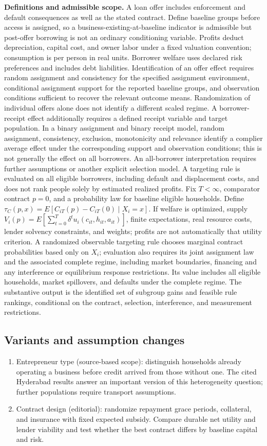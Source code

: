 \documentclass[11pt,a4paper]{article}
\begin{document}
\textbf{Definitions and admissible scope.} A loan offer includes enforcement and default consequences as well as the stated contract. Define baseline groups before access is assigned, so a business-existing-at-baseline indicator is admissible but post-offer borrowing is not an ordinary conditioning variable. Profits deduct depreciation, capital cost, and owner labor under a fixed valuation convention; consumption is per person in real units. Borrower welfare uses declared risk preferences and includes debt liabilities. Identification of an offer effect requires random assignment and consistency for the specified assignment environment, conditional assignment support for the reported baseline groups, and observation conditions sufficient to recover the relevant outcome means. Randomization of individual offers alone does not identify a different scaled regime. A borrower-receipt effect additionally requires a defined receipt variable and target population. In a binary assignment and binary receipt model, random assignment, consistency, exclusion, monotonicity and relevance identify a complier average effect under the corresponding support and observation conditions; this is not generally the effect on all borrowers. An all-borrower interpretation requires further assumptions or another explicit selection model. A targeting rule is evaluated on all eligible borrowers, including default and displacement costs, and does not rank people solely by estimated realized profits. Fix \(T<\infty\), comparator contract \(p=0\), and a probability law for baseline eligible households. Define \(\tau_C(p,x)=E[C_{iT}(p)-C_{iT}(0)\mid X_i=x]\). If welfare is optimized, supply \(V_i(p)=E[\sum_{t=0}^T\delta^t u_i(c_{it},h_{it},a_{it})]\), finite expectations, real resource costs, lender solvency constraints, and weights; profits are not automatically that utility criterion. A randomized observable targeting rule chooses marginal contract probabilities based only on \(X_i\); evaluation also requires its joint assignment law and the associated complete regime, including market boundaries, financing and any interference or equilibrium response restrictions. Its value includes all eligible households, market spillovers, and defaults under the complete regime. The substantive output is the identified set of subgroup gains and feasible rule rankings, conditional on the contract, selection, interference, and measurement restrictions.
\subsection*{Variants and assumption changes}
\begin{enumerate}
\item Entrepreneur type (source-based scope): distinguish households already operating a business before credit arrived from those without one. The cited Hyderabad results answer an important version of this heterogeneity question; further populations require transport assumptions.
\item Contract design (editorial): randomize repayment grace periods, collateral, and insurance with fixed expected subsidy. Compare durable net utility and lender viability and test whether the best contract differs by baseline capital and risk.
\end{enumerate}
\end{document}
